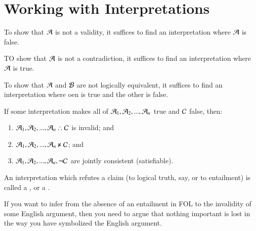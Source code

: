 \documentclass[12pt, a4paper, oneside, openright, titlepage]{book}
\begin{document}
\section{\textsection Working with Interpretations}

\begin{rmk}
    To show that $\mathcal{A}$ is not a validity, it suffices to find an interpretation where $\mathcal{A}$ is false.

    TO show that $\mathcal{A}$ is not a contradiction, it suffices to find an interpretation where $\mathcal{A}$ is true.
\end{rmk}


\begin{rmk}
    To show that $\mathcal{A}$ and $\mathcal{B}$ are not logically equivalent, it suffices to find an interpretation where oen is true and the other is false.
\end{rmk}


\begin{rmk}
    If some interpretation makes all of $\mathcal{A}_1,\mathcal{A}_2,...,\mathcal{A}_n$ true and $\mathcal{C}$ false, then: \begin{enumerate}
        \item $\metav{A}_1,\metav{A}_2,...,\metav{A}_n\therefore\metav{C}$ is invalid; and
        \item $\mathcal{A}_1,\mathcal{A}_2,...,\mathcal{A}_n\nvDash \mathcal{C}$; and
        \item $\mathcal{A}_1,\mathcal{A}_2,...,\mathcal{A}_n,\neg\mathcal{C}$ are jointly consistent (satisfiable).
    \end{enumerate}
\end{rmk}


\begin{defn}
    An interpretation which refutes a claim (to logical truth, say, or to entailment) is called a , or a .
\end{defn}

\begin{rmk}
    If you want to infer from the absence of an entailment in FOL to the invalidity of some English argument, then you need to argue that nothing important is lost in the way you have symbolized the English argument.
\end{rmk}
\end{document}
